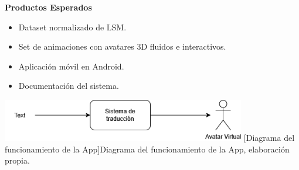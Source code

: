 \textbf{Productos Esperados}
\begin{itemize}
    \item Dataset normalizado de LSM.
    \item Set de animaciones con avatares 3D fluidos e interactivos.
    \item Aplicación móvil en Android.
    \item Documentación del sistema.\\
\end{itemize}

\begin{center}
    \includegraphics[width=0.8\textwidth]{Images/Cap 1/diacajanegra.png}
    [Diagrama del funcionamiento de la App]{Diagrama del funcionamiento de la App, elaboración propia.}
\end{center}

\newpage
